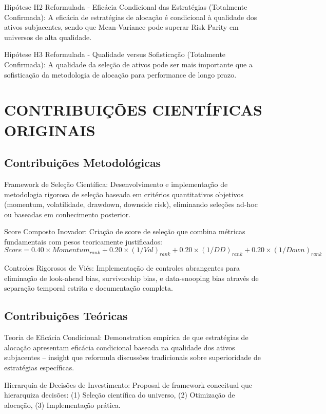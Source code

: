 Hipótese H2 Reformulada - Eficácia Condicional das Estratégias (Totalmente Confirmada): A eficácia de estratégias de alocação é condicional à qualidade dos ativos subjacentes, sendo que Mean-Variance pode superar Risk Parity em universos de alta qualidade.

Hipótese H3 Reformulada - Qualidade versus Sofisticação (Totalmente Confirmada): A qualidade da seleção de ativos pode ser mais importante que a sofisticação da metodologia de alocação para performance de longo prazo.

\section{CONTRIBUIÇÕES CIENTÍFICAS ORIGINAIS}

\subsection{Contribuições Metodológicas}

Framework de Seleção Científica: Desenvolvimento e implementação de metodologia rigorosa de seleção baseada em critérios quantitativos objetivos (momentum, volatilidade, drawdown, downside risk), eliminando seleções ad-hoc ou baseadas em conhecimento posterior.

Score Composto Inovador: Criação de score de seleção que combina métricas fundamentais com pesos teoricamente justificados:
\begin{equation}
Score = 0.40 \times Momentum_{rank} + 0.20 \times (1/Vol)_{rank} + 0.20 \times (1/DD)_{rank} + 0.20 \times (1/Down)_{rank}
\end{equation}

Controles Rigorosos de Viés: Implementação de controles abrangentes para eliminação de look-ahead bias, survivorship bias, e data-snooping bias através de separação temporal estrita e documentação completa.

\subsection{Contribuições Teóricas}

Teoria de Eficácia Condicional: Demonstration empírica de que estratégias de alocação apresentam eficácia condicional baseada na qualidade dos ativos subjacentes – insight que reformula discussões tradicionais sobre superioridade de estratégias específicas.

Hierarquia de Decisões de Investimento: Proposal de framework conceitual que hierarquiza decisões: (1) Seleção científica do universo, (2) Otimização de alocação, (3) Implementação prática.

